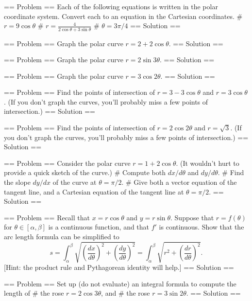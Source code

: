 == Problem ==
Each of the following equations is written in the polar coordinate system.  Convert each to an equation in the Cartesian coordinates.
# \(r=9\cos\theta\)
# \(\displaystyle r=\frac{4}{2\cos\theta+3\sin\theta}\)
# \(\theta = 3\pi/4\)
== Solution ==



== Problem ==
Graph the polar curve \(r=2+2\cos\theta\).
== Solution ==

== Problem ==
Graph the polar curve \(r=2\sin 3\theta\).
== Solution ==

== Problem ==
Graph the polar curve \(r=3\cos 2\theta\).
== Solution ==


== Problem ==
Find the points of intersection of \(r=3-3\cos\theta\) and \(r=3\cos\theta\). (If you don't graph the curves, you'll probably miss a few points of intersection.)
== Solution ==

== Problem ==
Find the points of intersection of \(r=2\cos 2\theta \) and \(r=\sqrt 3\). (If you don't graph the curves, you'll probably miss a few points of intersection.)
== Solution ==


== Problem ==
Consider the polar curve \(r=1+2\cos \theta\). (It wouldn't hurt to provide a quick sketch of the curve.)
# Compute both \(dx/d\theta\) and \(dy/d\theta\).
# Find the slope \(dy/dx\) of the curve at \(\theta=\pi/2\).
# Give both a vector equation of the tangent line, and a Cartesian equation of the tangent line at \(\theta=\pi/2\).
== Solution ==


== Problem ==
Recall that \(x=r\cos\theta\) and \(y=r\sin\theta\). Suppose that \(r=f(\theta)\) for \(\theta\in[\alpha,\beta]\) is a continuous function, and that \(f'\) is continuous.  
Show that the arc length formula can be simplified to 
\[
s=\int_{\alpha}^{\beta}\sqrt{\left(\frac{dx}{d\theta}\right)^2+\left(\frac{dy}{d\theta}\right)^2} 
= \int_{\alpha}^{\beta}\sqrt{r^2+\left(\frac{dr}{d\theta}\right)^2} .\]
[Hint: the product rule and Pythagorean identity will help.]
== Solution ==

== Problem ==
Set up (do not evaluate) an integral formula to compute the length of 
# the rose \(r=2\cos 3\theta\), and
# the rose \(r=3\sin 2\theta\).
== Solution ==


